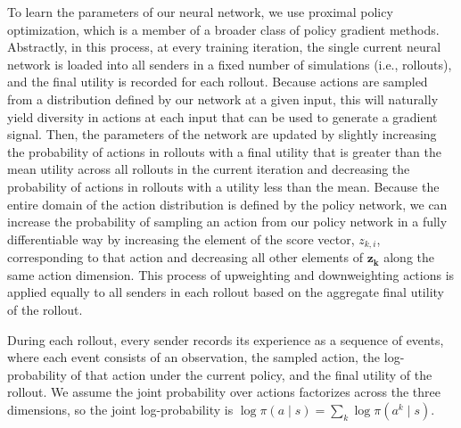 To learn the parameters of our neural network, we use proximal policy
optimization, which is a member of a broader class of policy gradient methods.
Abstractly, in this process, at every training iteration, the single current
neural network is loaded into all senders in a fixed number of simulations
(i.e., rollouts), and the final utility is recorded for each rollout. Because
actions are sampled from a distribution defined by our network at a given input,
this will naturally yield diversity in actions at each input that can be used to
generate a gradient signal. Then, the parameters of the network are updated by
slightly increasing the probability of actions in rollouts with a final utility
that is greater than the mean utility across all rollouts in the current
iteration and decreasing the probability of actions in rollouts with a utility
less than the mean. Because the entire domain of the action distribution is
defined by the policy network, we can increase the probability of sampling an
action from our policy network in a fully differentiable way by increasing the
element of the score vector, $z_{k,i}$, corresponding to that action and
decreasing all other elements of $\mathbf{z_k}$ along the same action dimension.
This process of upweighting and downweighting actions is applied equally to all
senders in each rollout based on the aggregate final utility of the rollout.

During each rollout, every sender records its experience as a sequence of
events, where each event consists of an observation, the sampled action, the
log-probability of that action under the current policy, and the final utility
of the rollout. We assume the joint probability over actions factorizes across the three
dimensions, so the joint log-probability is
$\log \pi(a \mid s) = \sum_k \log \pi(a^k \mid s)$.

